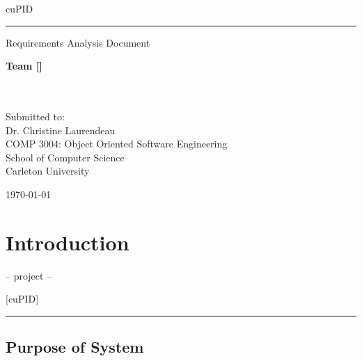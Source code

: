 \documentclass[12pt,letterpaper]{article}
\begin{document}
\begin{center}
	{\fontsize{55pt}{55pt}\selectfont cuPID}
	\vspace{0.5em}\rule{\textwidth}{0.5pt}
	Requirements Analysis Document
\end{center}

\vspace{5em}

\begin{center}
	\textbf{Team [\teamname{}]}\\
	\personone{}\\
	\persontwo{}\\
	\personthree{}
\end{center}

\vfill

\begin{center}
	Submitted to:\\
	Dr. Christine Laurendeau\\
	COMP 3004: Object Oriented Software Engineering\\
	School of Computer Science\\
	Carleton University
\end{center}

\vspace{2em}

\begin{center}
	\today
\end{center}

\newpage{}

\tableofcontents{}

\renewcommand{\listfigurename}{Figures}
\listoffigures

\renewcommand{\listtablename}{Tables}
\listoftables

\newpage{}

\section{Introduction}

\begin{center}
    -- project --
\end{center}

\begin{center}
	\Huge [cuPID]
\end{center}

\begin{center}
    \rule{0.85\textwidth}{0.5pt}
\end{center}

\subsection{Purpose of System}
\end{document}
